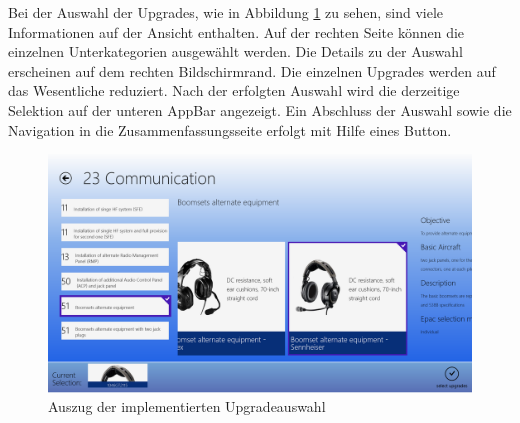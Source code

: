 Bei der Auswahl der Upgrades, wie in Abbildung \ref{upgradeSelectionImpl} zu sehen, sind viele Informationen auf der Ansicht enthalten. Auf der rechten Seite können die einzelnen Unterkategorien ausgewählt werden. Die Details zu der Auswahl erscheinen auf dem rechten Bildschirmrand. Die einzelnen Upgrades werden auf das Wesentliche reduziert. Nach der erfolgten Auswahl wird die derzeitige Selektion auf der unteren AppBar angezeigt. Ein Abschluss der Auswahl sowie die Navigation in die Zusammenfassungsseite erfolgt mit Hilfe eines Button. \par 
\begin{figure}[H]
\centering
\includegraphics[width=\hsize]{images/impl/select_upgrade_impl}
\caption{Auszug der implementierten Upgradeauswahl}
\label{upgradeSelectionImpl}
\end{figure}

